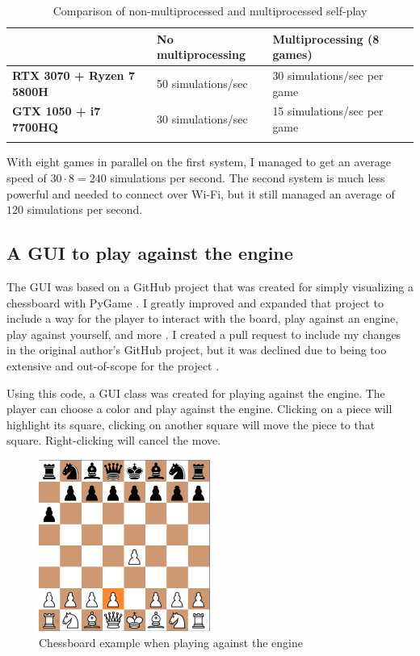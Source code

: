 \documentclass{article}
\begin{document}
\begin{table}[h!]
    \begin{tabularx}{\textwidth}{@{}Lll@{}}
    \toprule
    & \textbf{No multiprocessing} & \textbf{Multiprocessing (8 games)} \\ 
    \midrule 
    \textbf{RTX 3070 + Ryzen 7 5800H} & 50 simulations/sec & 30 simulations/sec per game \\ \addlinespace
    \textbf{GTX 1050 + i7 7700HQ} & 30 simulations/sec & 15 simulations/sec per game \\ \addlinespace
    
    \bottomrule
    \end{tabularx} 
    \caption{Comparison of non-multiprocessed and multiprocessed self-play}
\end{table}

With eight games in parallel on the first system, I managed to get an average speed of $30 \cdot 8 = 240$ simulations per second.
The second system is much less powerful and needed to connect over Wi-Fi, but it still managed an average of $120$ simulations per second. 

\subsection{A GUI to play against the engine}

The GUI was based on a GitHub project that was created for simply visualizing a chessboard with PyGame \cite{adefokunChessboardAhirajustice2022, pygame}.
I greatly improved and expanded that project to include a way for the player to interact with the board, play against an engine,
play against yourself, and more \cite{zjefferChessboardZjeffer2022}. I created a pull request to include my changes in the original author's GitHub project,
but it was declined due to being too extensive and out-of-scope for the project \cite{adefokunChessboard2022pull}.

Using this code, a GUI class was created for playing against the engine. The player can choose a color and play against
the engine. Clicking on a piece will highlight its square, clicking on another square will move the piece to that square.
Right-clicking will cancel the move.

\begin{figure}[H]
    \centering
    \includegraphics[width=0.5\textwidth]{img/chessboard-gui.png}
    \caption{Chessboard example when playing against the engine}
\end{figure}
\end{document}
